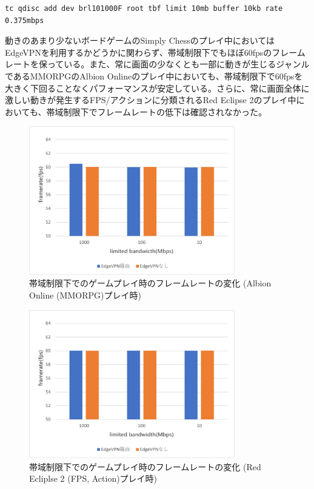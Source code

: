 \begin{lstlisting}[caption=帯域制限,label=ristrict_band]
    tc qdisc add dev brl101000F root tbf limit 10mb buffer 10kb rate 0.375mbps
\end{lstlisting}

動きのあまり少ないボードゲームのSimply Chessのプレイ中においてはEdgeVPNを利用するかどうかに関わらず、帯域制限下でもほぼ60fpsのフレームレートを保っている。また、常に画面の少なくとも一部に動きが生じるジャンルであるMMORPGのAlbion Onlineのプレイ中においても、帯域制限下で60fpsを大きく下回ることなくパフォーマンスが安定している。さらに、常に画面全体に激しい動きが発生するFPS/アクションに分類されるRed Eclipse 2のプレイ中においても、帯域制限下でフレームレートの低下は確認されなかった。

\begin{figure}[h!]
    \centering
    \includegraphics[width=0.8\textwidth,keepaspectratio,clip]{img/framerate_MMO.pdf}
    \caption{帯域制限下でのゲームプレイ時のフレームレートの変化 (Albion Online (MMORPG)プレイ時)}
    \label{fig:fps_mmo}
\end{figure}

\begin{figure}[h!]
    \centering
    \includegraphics[width=0.8\textwidth,keepaspectratio,clip]{img/framerate_FPS.pdf}
    \caption{帯域制限下でのゲームプレイ時のフレームレートの変化 (Red Ecliplse 2 (FPS, Action)プレイ時)}
    \label{fig:fps_fps}
\end{figure}

